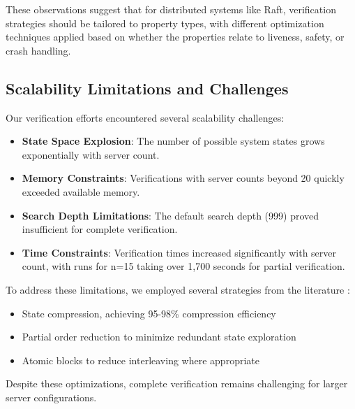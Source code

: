 These observations suggest that for distributed systems like Raft, verification strategies should be tailored to property types, with different optimization techniques applied based on whether the properties relate to liveness, safety, or crash handling.

\subsection{Scalability Limitations and Challenges}
\label{sec:scalability}

Our verification efforts encountered several scalability challenges:

\begin{itemize}
    \item \textbf{State Space Explosion}: The number of possible system states grows exponentially with server count.
    
    \item \textbf{Memory Constraints}: Verifications with server counts beyond 20 quickly exceeded available memory.
    
    \item \textbf{Search Depth Limitations}: The default search depth (999) proved insufficient for complete verification.
    
    \item \textbf{Time Constraints}: Verification times increased significantly with server count, with runs for n=15 taking over 1,700 seconds for partial verification.
\end{itemize}

To address these limitations, we employed several strategies from the literature \cite{Holzmann97, Garavel}:
\begin{itemize}
    \item State compression, achieving 95-98\% compression efficiency
    \item Partial order reduction to minimize redundant state exploration
    \item Atomic blocks to reduce interleaving where appropriate
\end{itemize}

Despite these optimizations, complete verification remains challenging for larger server configurations.

